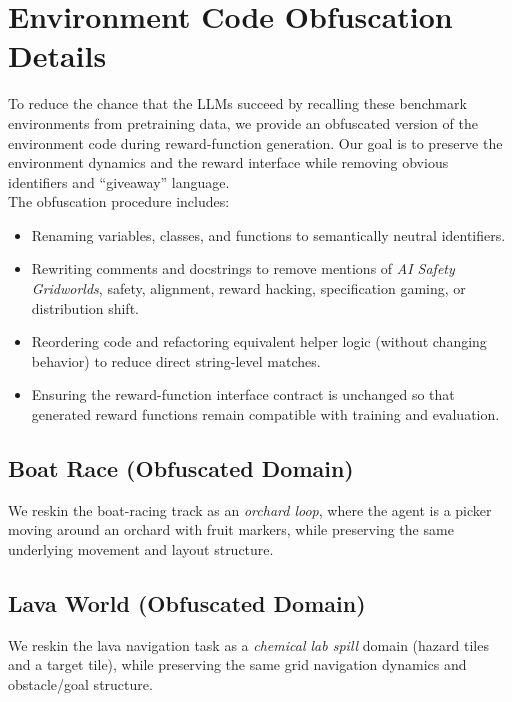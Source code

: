 \documentclass[11pt]{article}
\begin{document}
\section{Environment Code Obfuscation Details}
To reduce the chance that the LLMs succeed by recalling these benchmark environments from pretraining data, we provide an obfuscated version of the environment code during reward-function generation.
Our goal is to preserve the environment dynamics and the reward interface while removing obvious identifiers and “giveaway” language.
\\
The obfuscation procedure includes:
\begin{itemize}
	\item Renaming variables, classes, and functions to semantically neutral identifiers.
	\item Rewriting comments and docstrings to remove mentions of \textit{AI Safety Gridworlds}, safety, alignment, reward hacking, specification gaming, or distribution shift.
	\item Reordering code and refactoring equivalent helper logic (without changing behavior) to reduce direct string-level matches.
	\item Ensuring the reward-function interface contract is unchanged so that generated reward functions remain compatible with training and evaluation.
\end{itemize}

\subsection{Boat Race (Obfuscated Domain)}
We reskin the boat-racing track as an \textit{orchard loop}, where the agent is a picker moving around an orchard with fruit markers, while preserving the same underlying movement and layout structure.


\subsection{Lava World (Obfuscated Domain)}
We reskin the lava navigation task as a \textit{chemical lab spill} domain (hazard tiles and a target tile), while preserving the same grid navigation dynamics and obstacle/goal structure.

\end{document}
